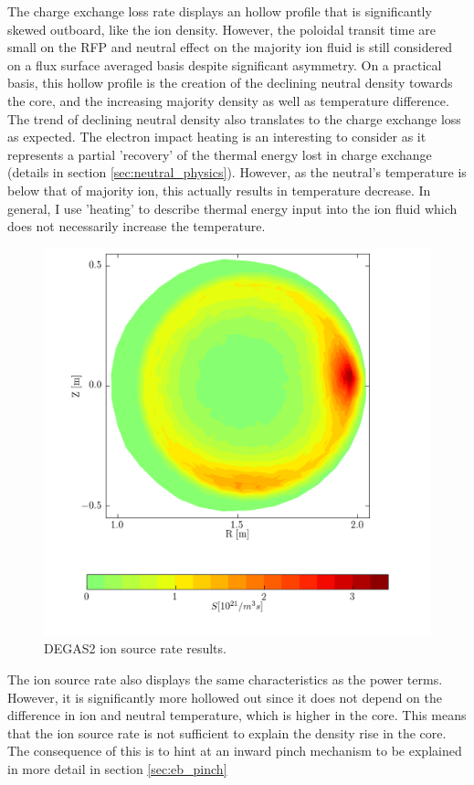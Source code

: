 The charge exchange loss rate displays an hollow profile that is significantly skewed outboard, like the ion density. However, the poloidal transit time are small on the RFP and neutral effect on the majority ion fluid is still considered on a flux surface averaged basis despite significant asymmetry. On a practical basis, this hollow profile is the creation of the declining neutral density towards the core, and the increasing majority density as well as temperature difference. The trend of declining neutral density also translates to the charge exchange loss as expected. The electron impact heating is an interesting to consider as it represents a partial 'recovery' of the thermal energy lost in charge exchange (details in section \ref{sec:neutral_physics}). However, as the neutral's temperature is below that of majority ion, this actually results in temperature decrease. In general, I use 'heating' to describe thermal energy input into the ion fluid which does not necessarily increase the temperature. 

\begin{figure}
    \centering
    \includegraphics{ion_transport_results/source_2d.png}
    \caption{DEGAS2 ion source rate results.}
    \label{fig:DEGAS2_source_rate}
\end{figure}

The ion source rate also displays the same characteristics as the power terms. However, it is significantly more hollowed out since it does not depend on the difference in ion and neutral temperature, which is higher in the core. This means that the ion source rate is not sufficient to explain the density rise in the core. The consequence of this is to hint at an inward pinch mechanism to be explained in more detail in section \ref{sec:eb_pinch}


